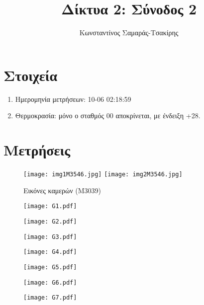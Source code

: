 \documentclass[a4paper,10pt]{article}
\title{Δίκτυα 2: Σύνοδος 2}
\author{Κωνσταντίνος Σαμαράς-Τσακίρης}
\begin{document}
	
	\maketitle
	
	\section{Στοιχεία}
	\begin{enumerate}
		\item Ημερομηνία μετρήσεων: 10-06 02:18:59
		\item Θερμοκρασία: μόνο ο σταθμός 00 αποκρίνεται, με ένδειξη +28.
	\end{enumerate}
	
	\section{Μετρήσεις}
	\begin{figure}
		\centering
		\texttt{[image: img1M3546.jpg]}
		\texttt{[image: img2M3546.jpg]}
		\caption{Εικόνες καμερών (M3039)}
	\end{figure}
	\begin{figure}
		\centering
		\texttt{[image: G1.pdf]}
	\end{figure}
	
	\begin{figure}
		\centering
		\texttt{[image: G2.pdf]}
	\end{figure}
	
	\begin{figure}
		\centering
		\texttt{[image: G3.pdf]}
	\end{figure}
	
	\begin{figure}
		\centering
		\texttt{[image: G4.pdf]}
	\end{figure}
	
	\begin{figure}
		\centering
		\texttt{[image: G5.pdf]}
	\end{figure}
	
	\begin{figure}
		\centering
		\texttt{[image: G6.pdf]}
	\end{figure}
	
	\begin{figure}
		\centering
		\texttt{[image: G7.pdf]}
	\end{figure}
	
\end{document}
